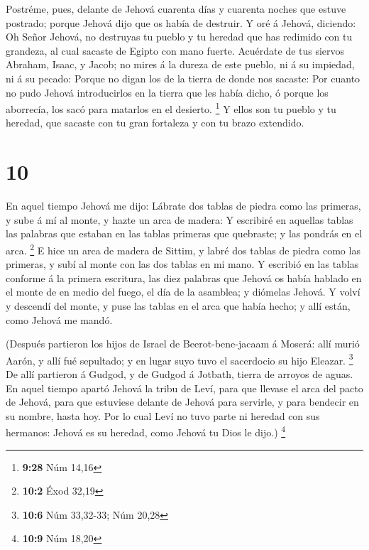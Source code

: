  Postréme, pues, delante de Jehová cuarenta días y cuarenta
noches que estuve postrado; porque Jehová dijo que os había de destruir.
 Y oré á Jehová, diciendo: Oh Señor Jehová, no destruyas tu
pueblo y tu heredad que has redimido con tu grandeza, al cual sacaste de
Egipto con mano fuerte.  Acuérdate de tus siervos Abraham,
Isaac, y Jacob; no mires á la dureza de este pueblo, ni á su impiedad,
ni á su pecado:  Porque no digan los de la tierra de donde
nos sacaste: Por cuanto no pudo Jehová introducirlos en la tierra que
les había dicho, ó porque los aborrecía, los sacó para matarlos en el
desierto. \footnote{\textbf{9:28} Núm 14,16}  Y ellos son
tu pueblo y tu heredad, que sacaste con tu gran fortaleza y con tu brazo
extendido.

\hypertarget{section-9}{%
\section{10}\label{section-9}}

 En aquel tiempo Jehová me dijo: Lábrate dos tablas de
piedra como las primeras, y sube á mí al monte, y hazte un arca de
madera:  Y escribiré en aquellas tablas las palabras que
estaban en las tablas primeras que quebraste; y las pondrás en el arca.
\footnote{\textbf{10:2} Éxod 32,19}  E hice un arca de
madera de Sittim, y labré dos tablas de piedra como las primeras, y subí
al monte con las dos tablas en mi mano.  Y escribió en las
tablas conforme á la primera escritura, las diez palabras que Jehová os
había hablado en el monte de en medio del fuego, el día de la asamblea;
y diómelas Jehová.  Y volví y descendí del monte, y puse las
tablas en el arca que había hecho; y allí están, como Jehová me mandó.

 (Después partieron los hijos de Israel de
Beerot-bene-jacaam á Moserá: allí murió Aarón, y allí fué sepultado; y
en lugar suyo tuvo el sacerdocio su hijo Eleazar. \footnote{\textbf{10:6}
  Núm 33,32-33; Núm 20,28}  De allí partieron á Gudgod, y de
Gudgod á Jotbath, tierra de arroyos de aguas.  En aquel
tiempo apartó Jehová la tribu de Leví, para que llevase el arca del
pacto de Jehová, para que estuviese delante de Jehová para servirle, y
para bendecir en su nombre, hasta hoy.  Por lo cual Leví no
tuvo parte ni heredad con sus hermanos: Jehová es su heredad, como
Jehová tu Dios le dijo.) \footnote{\textbf{10:9} Núm 18,20}

